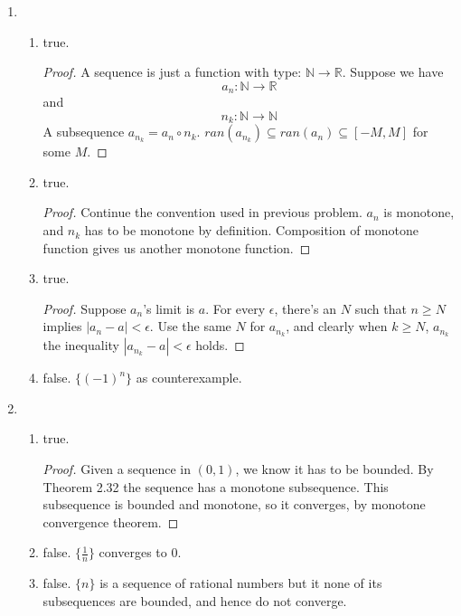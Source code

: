 \documentclass{article}
\begin{document}

\begin{enumerate}
\item
  \begin{enumerate}[label=\alph*.]
  \item true.
    \begin{proof}
      A sequence is just a function with type:
      $\mathbb{N} \rightarrow \mathbb{R}$.  Suppose we have
      \[a_n: \mathbb{N} \rightarrow \mathbb{R}\] and
      \[n_k: \mathbb{N} \rightarrow \mathbb{N}\] A subsequence
      $a_{n_{k}}=a_n \circ n_k$. $ran(a_{n_k}) \subseteq ran(a_n)
      \subseteq [-M,M]$ for some $M$.
    \end{proof}
  \item true.
    \begin{proof}
      Continue the convention used in previous problem. $a_n$ is
      monotone, and $n_k$ has to be monotone by
      definition. Composition of monotone function gives us another
      monotone function.
    \end{proof}
  \item true.
    \begin{proof}
      Suppose $a_n$'s limit is $a$.
      For every $\epsilon$, there's an $N$ such that $n \geq N$
      implies $|a_n - a| < \epsilon$. Use the same $N$ for $a_{n_k}$,
      and clearly when $k \geq N$, $a_{n_k}$ the inequality $|a_{n_k}-a| <
      \epsilon$ holds.
    \end{proof}
  \item false. $\{(-1)^n\}$ as counterexample.
  \end{enumerate}
\item
  \begin{enumerate}[label=\alph*.]
  \item true.
    \begin{proof}
      Given a sequence in $(0,1)$, we know it has to be bounded. By
      Theorem 2.32 the sequence has a monotone subsequence. This
      subsequence is bounded and monotone, so it converges, by
      monotone convergence theorem.
    \end{proof}
      
    \item false. $\{\frac{1}{n}\}$ converges to $0$.
    \item false. $\{n\}$ is a sequence of rational numbers but it none
      of its subsequences are bounded, and hence do not converge.
      

\end{enumerate}
\end{enumerate}
\end{document}
